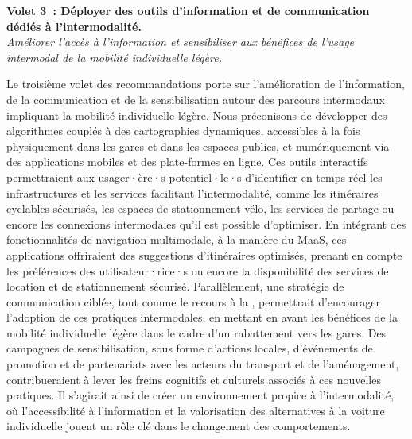 \begin{refsegment}
    \begin{displayquote}
\textbf{Volet 3~: Déployer des outils d’information et de communication dédiés à l’intermodalité.}
\\
\textsl{Améliorer l'accès à l'information et sensibiliser aux bénéfices de l'usage intermodal de la mobilité individuelle légère.}
    \end{displayquote}
Le troisième volet des recommandations porte sur l’amélioration de l’information, de la communication et de la sensibilisation autour des parcours intermodaux impliquant la mobilité individuelle légère. Nous préconisons de développer des algorithmes couplés à des cartographies dynamiques, accessibles à la fois physiquement dans les gares et dans les espaces publics, et numériquement via des applications mobiles et des plate-formes en ligne. Ces outils interactifs permettraient aux usager·ère·s potentiel·le·s d’identifier en temps réel les infrastructures et les services facilitant l’intermodalité, comme les itinéraires cyclables sécurisés, les espaces de stationnement vélo, les services de partage ou encore les connexions intermodales qu'il est possible d'optimiser. En intégrant des fonctionnalités de navigation multimodale, à la manière du \acrshort{MaaS}, ces applications offriraient des suggestions d’itinéraires optimisés, prenant en compte les préférences des utilisateur·rice·s ou encore la disponibilité des services de location et de stationnement sécurisé. Parallèlement, une stratégie de communication ciblée, tout comme le recours à la , permettrait d’encourager l’adoption de ces pratiques intermodales, en mettant en avant les bénéfices de la mobilité individuelle légère dans le cadre d'un rabattement vers les gares. Des campagnes de sensibilisation, sous forme d’actions locales, d’événements de promotion et de partenariats avec les acteurs du transport et de l’aménagement, contribueraient à lever les freins cognitifs et culturels associés à ces nouvelles pratiques. Il s’agirait ainsi de créer un environnement propice à l’intermodalité, où l’accessibilité à l’information et la valorisation des alternatives à la voiture individuelle jouent un rôle clé dans le changement des comportements.%


\end{refsegment}
